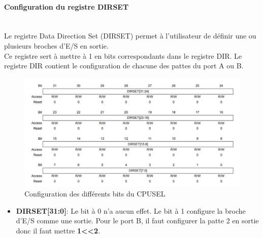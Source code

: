 \documentclass[a4paper]{article}
\begin{document}
	\paragraph{Configuration du registre DIRSET} 
	~~\\
	Le registre Data Direction Set (DIRSET) permet à l'utilisateur de définir une ou plusieurs broches d'E/S en sortie. \\
	Ce registre sert à mettre à 1 en bits correspondants dans le registre DIR. Le registre DIR contient le configuration de chacune des pattes du port A ou B. \\
	\begin{figure}[H]
		\centering
		\includegraphics[width=0.9\linewidth]{DIRSET.jpg}
		\caption{Configuration des différents bits du CPUSEL}
	\end{figure}
	\begin{itemize}
		\item {\bf DIRSET[31:0]}: Le bit à 0 n'a aucun effet. Le bit à 1 configure la broche d'E/S comme une sortie. Pour le port B, il faut configurer la patte 2 en sortie donc il faut mettre {\bf 1\textless\textless2}.
	\end{itemize}
	
\end{document}
